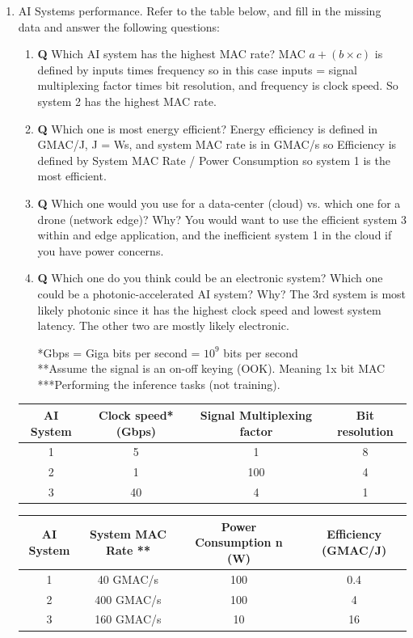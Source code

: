 \documentclass[main.tex]{subfiles}
\begin{document}
\begin{enumerate}
    \item AI Systems performance. Refer to the table below, and fill in the missing data and answer the following questions:
    \begin{enumerate}
    \item \textbf{Q} Which AI system has the highest MAC rate?  MAC $a+(b \times c)$ is defined by inputs times frequency so in this case inputs = signal multiplexing factor times bit resolution, and frequency is clock speed. So system 2 has the highest MAC rate. 
    \item \textbf{Q} Which one is most energy efficient?  Energy efficiency is defined in GMAC/J, J = Ws, and system MAC rate is in GMAC/s so Efficiency is defined by System MAC Rate / Power Consumption so system 1 is the most efficient. 
    \item \textbf{Q} Which one would you use for a data-center (cloud) vs. which one for a drone (network edge)? Why? You would want to use the efficient system 3 within and edge application, and the inefficient system 1 in the cloud if you have power concerns.
    \item \textbf{Q} Which one do you think could be an electronic system? Which one could be a photonic-accelerated AI system? Why? The 3rd system is most likely photonic since it has the highest clock speed and lowest system latency. The other two are mostly likely electronic.
    
    *Gbps = Giga bits per second = $10^9$ bits per second\\
    **Assume the signal is an on-off keying (OOK). Meaning 1x bit MAC\\
    ***Performing the inference tasks (not training).\\
    
    \end{enumerate}
    \begin{center}
    \begin{tabular}{||c c c c||} 
     \hline
     AI System & Clock speed* (Gbps) & Signal Multiplexing factor & Bit resolution \\ [0.5ex] 
     \hline\hline
     1 & 5 & 1 & 8 \\ 
     \hline
     2 & 1 & 100 & 4 \\
     \hline
     3 & 40 & 4 & 1 \\ [1ex] 
     \hline
    \end{tabular}
    \end{center}
    
    \begin{center}
    \begin{tabular}{||c c c c||} 
     \hline
     AI System & System MAC Rate ** & Power Consumption n (W) & Efficiency (GMAC/J) \\ [0.5ex] 
     \hline\hline
     1 & 40 GMAC/s & 100 & 0.4 \\ 
     \hline
     2 & 400 GMAC/s & 100 & 4 \\
     \hline
     3 & 160 GMAC/s & 10 & 16 \\ [1ex] 
     \hline
    \end{tabular}
    \end{center}
    

\end{enumerate}
\end{document}
